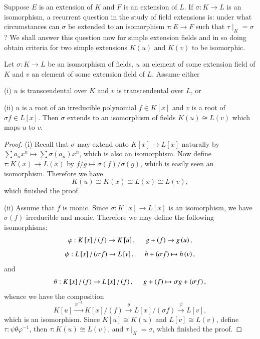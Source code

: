 Suppose $E$ is an extension of $K$ and $F$ is an extension of $L$. If $\sigma:K\to L$ is an isomorphism, a recurrent question in the study of field extensions is: under what circumstances can $\sigma$ be extended to an isomorphism $\tau:E\to F$ such that $\tau\mid_K=\sigma$? We shall answer this question now for simple extension fields and in so doing obtain criteria for two simple extensions $K(u)$ and $K(v)$ to be isomorphic.\par
\begin{theorem}
Let $\sigma:K\to L$ be an isomorphism of fields, $u$ an element of some extension field of $K$ and $v$ an element of some extension field of $L$. Assume either \par
(i) $u$ is transcendental over $K$ and $v$ is transcendental over $L$, or\par
(ii) $u$ is a root of an irreducible polynomial $f\in K[x]$ and $v$ is a root of $\sigma f\in L[x]$. Then $\sigma$ extends to an isomorphism of fields $K(u)\cong L(v)$ which maps $u$ to $v$.
\end{theorem}
\begin{proof}
(i) Recall that $\sigma$ may extend onto $K[x]\to L[x]$ naturally by $\sum a_nx^n\mapsto\sum\sigma(a_n)x^n$, which is also an isomorphism. Now define $\tau:K(x)\to L(x)$ by $f/g\mapsto \sigma(f)/\sigma(g)$, which is easily seen an isomorphism. Therefore we have 
$$
K\left( u \right) \cong K\left( x \right) \cong L\left( x \right) \cong L\left( v \right) ,
$$
which finished the proof.\par
(ii) Assume that $f$ is monic. Since $\sigma:K[x]\to L[x]$ is an isomorphism, we have $\sigma(f)$ irreducible and monic. Therefore we may define the following isomorphisms: 
$$
\varphi :K\left[ x \right] /\left( f \right) \rightarrow K\left[ u \right] ,\hspace{0.5cm}g+\left( f \right) \rightarrow g\left( u \right) ,
$$
$$
\psi :L\left[ x \right] /\left( \sigma f \right) \rightarrow L\left[ v \right] ,\hspace{0.5cm}h+\left( \sigma f \right) \mapsto h\left( v \right) ,
$$
and 
$$
\theta :K\left[ x \right] /\left( f \right) \rightarrow L\left[ x \right] /\left( f \right) ,\hspace{0.5cm}g+\left( f \right) \mapsto \sigma g+\left( \sigma f \right) ,
$$
whence we have the composition 
$$
K\left[ u \right] \overset{\varphi ^{-1}}{\longrightarrow}K\left[ x \right] /\left( f \right) \overset{\theta}{\longrightarrow}L\left[ x \right] /\left( \sigma f \right) \overset{\psi}{\longrightarrow}L\left[ v \right] ,
$$
which is an isomorphism. Since $K[u]\cong K(u)$ and $L[v]\cong L(v)$, define $\tau:\psi\theta\varphi^{-1}$, then $\tau:K(u)\cong L(v)$, and $\tau\mid_K=\sigma$, which finished the proof.
\end{proof}
